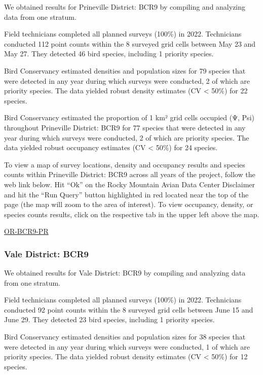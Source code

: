 \documentclass[
  letterpaper,
  DIV=11,
  numbers=noendperiod,
  oneside]{scrreprt}
\begin{document}
We obtained results for Prineville District: BCR9 by compiling and
analyzing data from one stratum.

Field technicians completed all planned surveys (100\%) in 2022.
Technicians conducted 112 point counts within the 8 surveyed grid cells
between May 23 and May 27. They detected 46 bird species, including 1
priority species.

Bird Conservancy estimated densities and population sizes for 79 species
that were detected in any year during which surveys were conducted, 2 of
which are priority species. The data yielded robust density estimates
(CV \textless{} 50\%) for 22 species.

Bird Conservancy estimated the proportion of 1 km² grid cells occupied
(Ψ, Psi) throughout Prineville District: BCR9 for 77 species that were
detected in any year during which surveys were conducted, 2 of which are
priority species. The data yielded robust occupancy estimates (CV
\textless{} 50\%) for 24 species.

To view a map of survey locations, density and occupancy results and
species counts within Prineville District: BCR9 across all years of the
project, follow the web link below. Hit ``Ok'' on the Rocky Mountain
Avian Data Center Disclaimer and hit the ``Run Query'' button
highlighted in red located near the top of the page (the map will zoom
to the area of interest). To view occupancy, density, or species counts
results, click on the respective tab in the upper left above the map.

\href{http://www.rmbo.org/new_site/adc/QueryWindow.aspx\#N4IgzgLgTghhCuBbEAuABCA8gJQLQCEBhbATlwAVt194oBTGeNAewDM0AZGAOwBM0AsjxgBzOojrcIaXGnJQAltzoA3BQBt1dNABEFkRQGMIIAL5A===}{OR-BCR9-PR}

\hypertarget{vale-district-bcr9}{%
\subsubsection{Vale District: BCR9}\label{vale-district-bcr9}}

We obtained results for Vale District: BCR9 by compiling and analyzing
data from one stratum.

Field technicians completed all planned surveys (100\%) in 2022.
Technicians conducted 92 point counts within the 8 surveyed grid cells
between June 15 and June 29. They detected 23 bird species, including 1
priority species.

Bird Conservancy estimated densities and population sizes for 38 species
that were detected in any year during which surveys were conducted, 1 of
which are priority species. The data yielded robust density estimates
(CV \textless{} 50\%) for 12 species.
\end{document}
